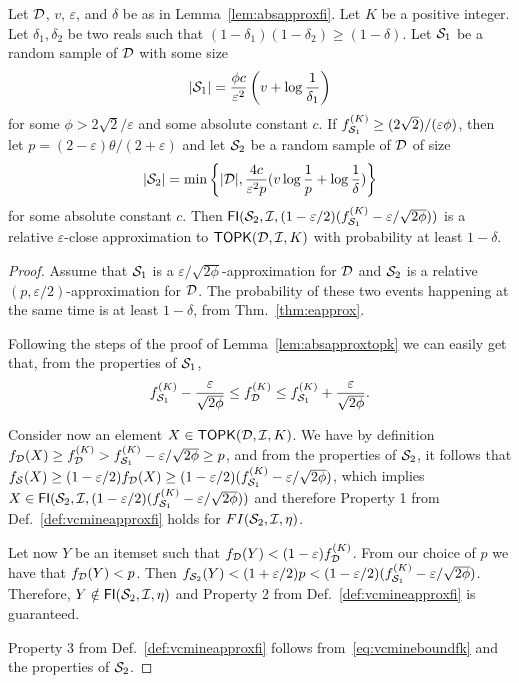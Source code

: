 \begin{lemma}\label{lem:relapproxtopk}
  Let ${\cal D}$, $v$, $\varepsilon$, and $\delta$ be as in Lemma~\ref{lem:absapproxfi}.
  Let $K$ be a positive integer. Let $\delta_1,\delta_2$ be two reals such that
  $(1-\delta_1)(1-\delta_2)\ge(1-\delta)$. Let ${\cal S}_1$ be a random sample of
  ${\cal D}$ with some size
  \[
  |{\cal S}_1|=\frac{\phi c}{\varepsilon^2}\left(v+\log\frac{1}{\delta_1}\right)\]
  for some $\phi>2\sqrt{2}/\varepsilon$ and some absolute constant $c$. If
  $f_{{\cal S}_1}^{(K)}\ge (2\sqrt{2})/(\varepsilon\phi)$, then let
  $p=(2-\varepsilon)\theta/(2+\varepsilon)$ and let ${\cal S}_2$ be
  a random sample of ${\cal D}$ of size 
  \[ |{\cal S}_2|=\min\left\{|{\cal D}|,
  \frac{4c}{\varepsilon^2p}(v\log\frac{1}{p} + \log\frac{1}{\delta})\right\}\]
  for some
  absolute constant $c$. Then
  $\mathsf{FI}({\cal S}_2,{\cal I},(1-\varepsilon/2)(f_{{\cal S}_1}^{(K)}-\varepsilon/\sqrt{2\phi}))$
  is a relative $\varepsilon$-close approximation to $\mathsf{TOPK}({\cal D},{\cal I},K)$ with
  probability at least $1-\delta$.
\end{lemma}

\begin{proof}
  Assume that ${\cal S}_1$ is a $\varepsilon/\sqrt{2\phi}$-approximation for
  ${\cal D}$ and ${\cal S}_2$ is a relative $(p,\varepsilon/2)$-approximation for ${\cal D}$.
  The probability of these two events happening at the same time is at least
  $1-\delta$, from Thm.~\ref{thm:eapprox}.

  Following the steps of the proof of Lemma~\ref{lem:absapproxtopk} we can
  easily get that, from the properties of ${\cal S}_1$,
  \begin{equation}\label{eq:vcmineboundfk}
    f_{{\cal S}_1}^{(K)}-\frac{\varepsilon}{\sqrt{2\phi}}\le f_{\cal D}^{(K)}\le
    f_{{\cal S}_1}^{(K)}+\frac{\varepsilon}{\sqrt{2\phi}}.
  \end{equation}

  Consider now an element $X\in\mathsf{TOPK}({\cal D},{\cal I},K)$. We have by definition
  $f_{\cal D}(X)\ge f_{\cal D}^{(K)} > f_{{\cal S}_1}^{(K)}-\varepsilon/\sqrt{2\phi}\ge
  p$, and from the properties of ${\cal S}_2$, it follows that $f_{\cal S}(X)\ge
  (1-\varepsilon/2)f_{\cal D}(X)\ge(1-\varepsilon/2)(f_{{\cal S}_1}^{(K)}-\varepsilon/\sqrt{2\phi})$,
  which implies
  $X\in\mathsf{FI}({\cal S}_2,{\cal I},(1-\varepsilon/2)(f_{{\cal S}_1}^{(K)}-\varepsilon/\sqrt{2\phi}))$
  and therefore Property 1 from Def.~\ref{def:vcmineapproxfi} holds for
  $FI({\cal S}_2,{\cal I},\eta)$.
 
  Let now $Y$ be an itemset such that $f_{\cal D}(Y)<(1-\varepsilon)f_{\cal D}^{(K)}$.
  From our choice of $p$ we have that $f_{\cal D}(Y)< p$. Then
  $f_{{\cal S}_2}(Y)<(1+\varepsilon/2)p<(1-\varepsilon/2)(f_{{\cal S}_1}^{(K)}-\varepsilon/\sqrt{2\phi})$.
  Therefore, $Y\notin\mathsf{FI}({\cal S}_2,{\cal I},\eta)$ and Property 2 from
  Def.~\ref{def:vcmineapproxfi} is guaranteed.

  Property 3 from Def.~\ref{def:vcmineapproxfi} follows from~\eqref{eq:vcmineboundfk} and
  the properties of ${\cal S}_2$.
\end{proof}

